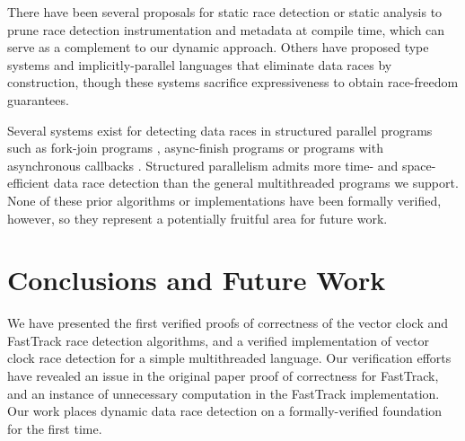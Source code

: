 \documentclass[preprint, 10pt]{sigplanconf}
\begin{document}
There have been several proposals for static race detection \cite{engler_racerx:_2003,naik_effective_2006} or static analysis \cite{flanagan_redcard:_2013,joserenau} to prune race detection instrumentation and metadata at compile time, which can serve as a complement to our dynamic approach. Others have proposed type systems \cite{abadi_types_2006,bocchino_type_2009,rust} and implicitly-parallel languages \cite{rinard_design_1998,guy_blelloch_nesl:_1992} that eliminate data races by construction, though these systems sacrifice expressiveness to obtain race-freedom guarantees.

Several systems exist for detecting data races in structured parallel programs such as fork-join programs \cite{john_mellor-crummey_--fly_1991,feng_efficient_1997,mai_zheng_grace:_2011,michael_boyer_automated_2008}, async-finish programs \cite{raman_scalable_2012} or programs with asynchronous callbacks \cite{petrov_race_2012,raychev_effective_2013,hsiao_race_2014,vechev_oopsla_2015}. Structured parallelism admits more time- and space-efficient data race detection than the general multithreaded programs we support. None of these prior algorithms or implementations have been formally verified, however, so they represent a potentially fruitful area for future work.

\section{Conclusions and Future Work}
\label{conclusion}
We have presented the first verified proofs of correctness of the vector clock and FastTrack race detection algorithms, and a verified implementation of vector clock race detection for a simple multithreaded language. Our verification efforts have revealed an issue in the original paper proof of correctness for FastTrack, and an instance of unnecessary computation in the FastTrack implementation. Our work places dynamic data race detection on a formally-verified foundation for the first time.
\end{document}
